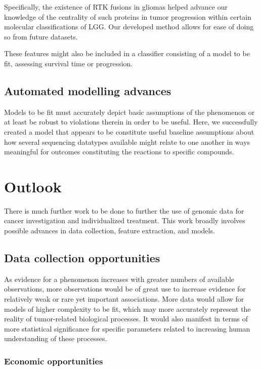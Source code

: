 Specifically, the existence of RTK fusions in gliomas helped advance our knowledge of the centrality of such proteins in tumor progression within certain molecular classifications of LGG.
Our developed method allows for ease of doing so from future datasets. 

These features might also be included in a classifier consisting of a model to be fit, assessing survival time or progression.


\subsection{Automated modelling advances}

Models to be fit must accurately depict basic assumptions of the phenomenon or at least be robust to violations therein in order to be useful. Here, we successfully created a model that appears to be constitute useful baseline assumptions about how several sequencing datatypes available might relate to one another in ways meaningful for outcomes constituting the reactions to specific compounds.


\section{Outlook}

There is much further work to be done to further the use of genomic data for cancer investigation and individualized treatment. This work broadly involves possible advances in data collection, feature extraction, and models. 

\subsection{Data collection opportunities}

As evidence for a phenomenon increases with greater numbers of available observations, more observations would be of great use to increase evidence for relatively weak or rare yet important associations. More data would allow for models of higher complexity to be fit, which may more accurately represent the reality of tumor-related biological processes. It would also manifest in terms of more statistical significance for specific parameters related to increasing human understanding of these processes.

\subsubsection{Economic opportunities}

